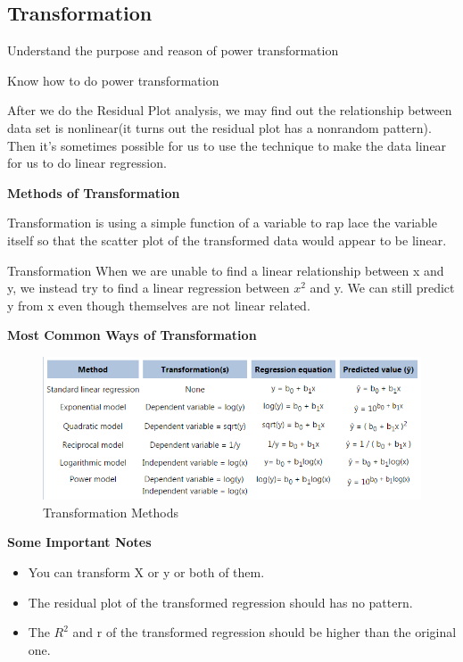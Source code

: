 \subsection{Transformation}
\begin{objectives}
    \item Understand the purpose and reason of power transformation
    \item Know how to do power transformation
\end{objectives}
\vbox{}
After we do the Residual Plot analysis, we may find out the relationship between data set is nonlinear(it turns out the residual plot has a nonrandom pattern). Then it's sometimes possible for us to use the technique  to make the data linear for us to do linear regression.
\begin{Center}
    \textbf{Methods of Transformation}
\end{Center}
Transformation is using a simple function of a variable to rap lace the variable itself so that the scatter plot of the transformed data would appear to be linear. \\
\begin{examplebox}{Transformation}
    When we are unable to find a linear relationship between x and y, we instead try to find a linear regression between \(x^2\) and y. We can still predict y from x even though themselves are not linear related.
\end{examplebox}
\vbox{}
\begin{Center}
    \textbf{Most Common Ways of Transformation}
\end{Center}
\begin{figure}[H]
    \centering
        \includegraphics[width=150mm]{transformation.png}
        \caption{Transformation Methods}
        \label{fig:my_label}
\end{figure}
\begin{Center}
    \textbf{Some Important Notes}
\end{Center}
\begin{itemize}
    \item You can transform X or y or both of them.
    \item The residual plot of the transformed regression should has no pattern.
    \item The \(R^2\) and r of the transformed regression should be higher than the original one.
\end{itemize}
